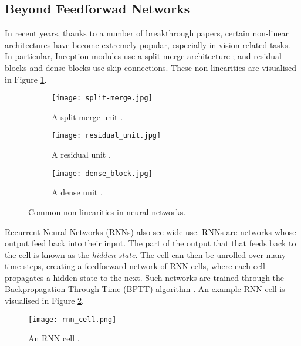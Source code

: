\subsection{Beyond Feedforwad Networks}
In recent years, thanks to a number of breakthrough papers, certain non-linear architectures have become extremely popular, especially in vision-related tasks.
In particular, Inception modules use a split-merge architecture \cite{Szegedy2015-inception, Szegedy2016-inception-res}; and residual blocks \cite{He2016-resnet, Xie2017-resnext, Szegedy2016-inception-res} and dense blocks \cite{Huang2017-densenet} use skip connections.
These non-linearities are visualised in Figure \ref{fig:2-non-linearities}.
\begin{figure}[hbtp]
    \centering
    \hspace{0.2cm}
    \begin{subfigure}[]{0.33\textwidth}
        \centering
        \texttt{[image: split-merge.jpg]}
        \caption{A split-merge unit \cite{Szegedy2015-inception, Szegedy2016-inception-res}.}
    \end{subfigure}%
    \hfill
    \begin{subfigure}[]{0.30\textwidth}
        \centering
        \texttt{[image: residual\_unit.jpg]}
        \caption{A residual unit \cite{He2016-resnet, Xie2017-resnext, Szegedy2016-inception-res}.}
    \end{subfigure}%
    \hfill
    \begin{subfigure}[]{0.33\textwidth}
        \centering
        \texttt{[image: dense\_block.jpg]}
        \caption{A dense unit \cite{Huang2017-densenet}.}
    \end{subfigure}%
    \hspace{0.2cm}
    \caption{Common non-linearities in neural networks.}
    \label{fig:2-non-linearities}
\end{figure}

Recurrent Neural Networks (RNNs) also see wide use.
RNNs are networks whose output feed back into their input.
The part of the output that that feeds back to the cell is known as the \textit{hidden state}.
The cell can then be unrolled over many time steps, creating a feedforward network of RNN cells, where each cell propagates a hidden state to the next.
Such networks are trained through the Backpropagation Through Time (BPTT) algorithm \cite{Robinson1987-rnn, Mozer1989-bptt, Werbos1990-bptt}.
An example RNN cell is visualised in Figure \ref{fig:2-rnn-cell}.
\begin{figure}[h]
    \centering
    \texttt{[image: rnn\_cell.png]}
    \caption{An RNN cell \cite[p.~22]{cs231n-rnns}.}
    \label{fig:2-rnn-cell}
\end{figure}

